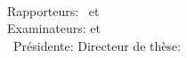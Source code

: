\hfill
\vfill
{
	\small
	\textit{\thesisTitle} \\
    \thesisName\ \textcopyright\ \thesisDate \\
	\thesisSubject\\
	Rapporteurs: \thesisFirstReviewer\ et \thesisSecondReviewer \\
    Examinateurs: \thesisFirstExaminer et \thesisSecondExaminer\\\
    Présidente: \thesisPresident
	Directeur de th\`ese: \thesisFirstSupervisor\\
	\textbf{\thesisUniversity} \\
    \thesisUniversityDepartment \\[1.5em]
    \textbf{\thesisUniversityGroup} \\
	\thesisUniversityInstitute \\
    \thesisUniversityStreetAddress \\
	\thesisUniversityPostalCode\ \thesisUniversityCity~\thesisUniversityCityCedex
}
